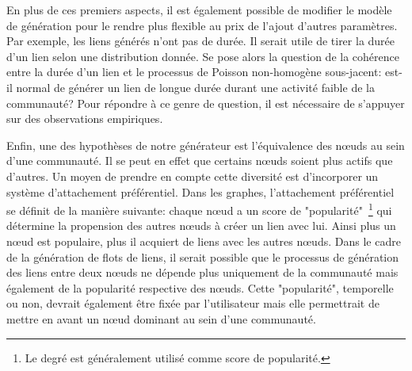 En plus de ces premiers aspects, il est également possible de modifier le modèle de génération pour le rendre plus flexible au prix de l'ajout d'autres paramètres.
Par exemple, les liens générés n'ont pas de durée.
Il serait utile de tirer la durée d'un lien selon une distribution donnée.
Se pose alors la question de la cohérence entre la durée d'un lien et le processus de Poisson non-homogène sous-jacent: est-il normal de générer un lien de longue durée durant une activité faible de la communauté?
Pour répondre à ce genre de question, il est nécessaire de s'appuyer sur des observations empiriques.

Enfin, une des hypothèses de notre générateur est l'équivalence des n\oe{}uds au sein d'une communauté.
Il se peut en effet que certains n\oe{}uds soient plus actifs que d'autres.
Un moyen de prendre en compte cette diversité est d'incorporer un système d'attachement préférentiel.
Dans les graphes, l'attachement préférentiel se définit de la manière suivante: chaque n\oe{}ud a un score de "popularité"~\footnote{Le degré est généralement utilisé comme score de popularité.} qui détermine la propension des autres n\oe{}uds à créer un lien avec lui.
Ainsi plus un n\oe{}ud est populaire, plus il acquiert de liens avec les autres n\oe{}uds.
Dans le cadre de la génération de flots de liens, il serait possible que le processus de génération des liens entre deux n\oe{}uds ne dépende plus uniquement de la communauté mais également de la popularité respective des n\oe{}uds.
Cette "popularité", temporelle ou non, devrait également être fixée par l'utilisateur mais elle permettrait de mettre en avant un n\oe{}ud dominant au sein d'une communauté.





